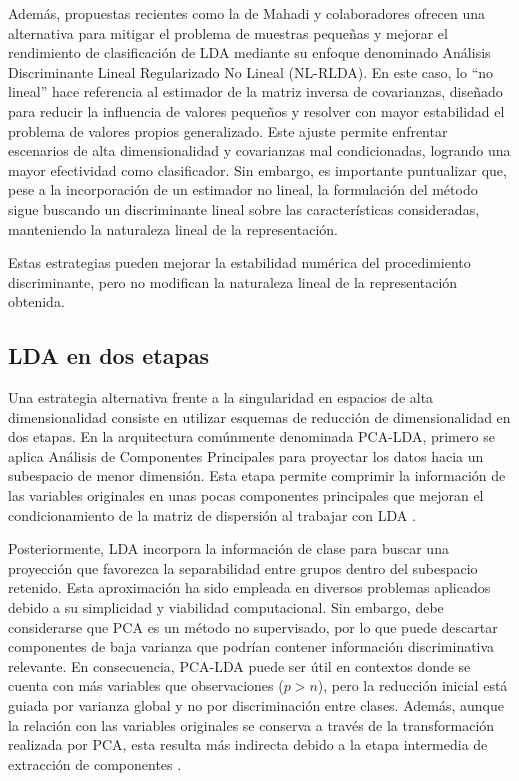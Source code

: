 Además, propuestas recientes como la de Mahadi y colaboradores \cite{mahadi2024regularized} ofrecen una alternativa para mitigar el problema de muestras pequeñas y mejorar el rendimiento de clasificación de LDA mediante su enfoque denominado Análisis Discriminante Lineal Regularizado No Lineal (NL-RLDA). En este caso, lo “no lineal” hace referencia al estimador de la matriz inversa de covarianzas, diseñado para reducir la influencia de valores pequeños y resolver con mayor estabilidad el problema de valores propios generalizado. Este ajuste permite enfrentar escenarios de alta dimensionalidad y covarianzas mal condicionadas, logrando una mayor efectividad como clasificador. Sin embargo, es importante puntualizar que, pese a la incorporación de un estimador no lineal, la formulación del método sigue buscando un discriminante lineal sobre las características consideradas, manteniendo la naturaleza lineal de la representación.

Estas estrategias pueden mejorar la estabilidad numérica del procedimiento discriminante, pero no modifican la naturaleza lineal de la representación obtenida.

\subsection{LDA en dos etapas}

Una estrategia alternativa frente a la singularidad en espacios de alta dimensionalidad consiste en utilizar esquemas de reducción de dimensionalidad en dos etapas. En la arquitectura comúnmente denominada PCA-LDA, primero se aplica Análisis de Componentes Principales para proyectar los datos hacia un subespacio de menor dimensión. Esta etapa permite comprimir la información de las variables originales en unas pocas componentes principales que mejoran el condicionamiento de la matriz de dispersión al trabajar con LDA \cite{agatra2025evaluating}.

Posteriormente, LDA incorpora la información de clase para buscar una proyección que favorezca la separabilidad entre grupos dentro del subespacio retenido. Esta aproximación ha sido empleada en diversos problemas aplicados debido a su simplicidad y viabilidad computacional. Sin embargo, debe considerarse que PCA es un método no supervisado, por lo que puede descartar componentes de baja varianza que podrían contener información discriminativa relevante. 
En consecuencia, PCA-LDA puede ser útil en contextos donde se cuenta con más variables que observaciones ($p > n$), pero la reducción inicial está guiada por varianza global y no por discriminación entre clases. Además, aunque la relación con las variables originales se conserva a través de la transformación realizada por PCA, esta resulta más indirecta debido a la etapa intermedia de extracción de componentes \cite{buhas2024renal}.

